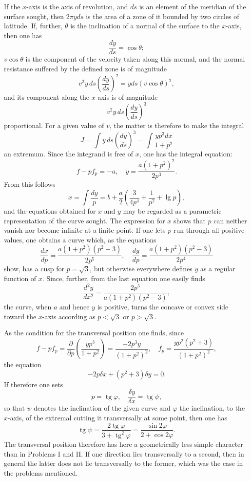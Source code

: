 \documentclass[11pt,a4paper,leqno]{article}
\begin{document}
If the $x$-axis is the axis of revolution, and $ds$ is an element of the meridian of the surface sought, then $2\pi yds$ is the area of a zone of it bounded by two circles of latitude. If, further, $\theta$ is the inclination of a normal of the surface to the $x$-axis, then one has
\[
\frac{dy}{ds}=\cos\theta;
\]
$v\cos\theta$ is the component of the velocity taken along this normal, and the normal resistance suffered by the defined zone is of magnitude
\[
v^2y\,ds\left(\frac{dy}{ds}\right)^2=yds(v\cos\theta)^2,
\]
and its component along the $x$-axis is of magnitude
\[
v^2y\,ds\left(\frac{dy}{ds}\right)^3
\]
proportional. For a given value of $v$, the matter is therefore to make the integral
\[
J=\int y\,ds\left(\frac{dy}{ds}\right)^3=\int \frac{yp^3dx}{1+p^2}
\]
an extremum. Since the integrand is free of $x$, one has the integral equation:
\begin{equation}\tag{17}
f-pf_p=-a,\quad y=\frac{a(1+p^2)^2}{2p^3}.
\end{equation}
From this follows
\begin{equation}\tag{17}
x=\int \frac{dy}{p}=b+\frac{a}{2}\left(\frac{3}{4p^4}+\frac{1}{p^2}+\operatorname{lg}p\right),
\end{equation}
and the equations obtained for $x$ and $y$ may be regarded as a parametric representation of the curve sought. The expression for $x$ shows that $p$ can neither vanish nor become infinite at a finite point. If one lets $p$ run through all positive values, one obtains a curve which, as the equations
\begin{equation}\tag{18}
\frac{dx}{dp}=\frac{a(1+p^2)(p^2-3)}{2p^5},\quad
\frac{dy}{dp}=\frac{a(1+p^2)(p^2-3)}{2p^4}
\end{equation}
show, has a cusp for $p=\sqrt{3}$, but otherwise everywhere defines $y$ as a regular function of $x$. Since, further, from the last equation one easily finds
\[
\frac{d^2y}{dx^2}=\frac{2p^5}{a(1+p^2)(p^2-3)},
\]
the curve, when $a$ and hence $y$ is positive, turns the concave or convex side toward the $x$-axis according as $p<\sqrt{3}$ or $p>\sqrt{3}$.

As the condition for the transversal position one finds, since
\[
f-pf_p=\frac{\partial}{\partial p}\left(\frac{yp^3}{1+p^2}\right)=\frac{-2p^3y}{(1+p^2)^2},\quad
f_p=\frac{yp^2(p^2+3)}{(1+p^2)^2},
\]
the equation
\[
-2p\delta x+(p^2+3)\delta y=0.
\]
If therefore one sets
\[
p=\operatorname{tg}\varphi,\quad \frac{\delta y}{\delta x}=\operatorname{tg}\psi,
\]
so that $\psi$ denotes the inclination of the given curve and $\varphi$ the inclination, to the $x$-axis, of the extremal cutting it transversally at some point, then one has
\[
\operatorname{tg}\psi=\frac{2\operatorname{tg}\varphi}{3+\operatorname{tg}^2\varphi}=\frac{\sin 2\varphi}{2+\cos 2\varphi}.
\]
The transversal position therefore has here a geometrically less simple character than in Problems I and II. If one direction lies transversally to a second, then in general the latter does not lie transversally to the former, which was the case in the problems mentioned.
\end{document}

